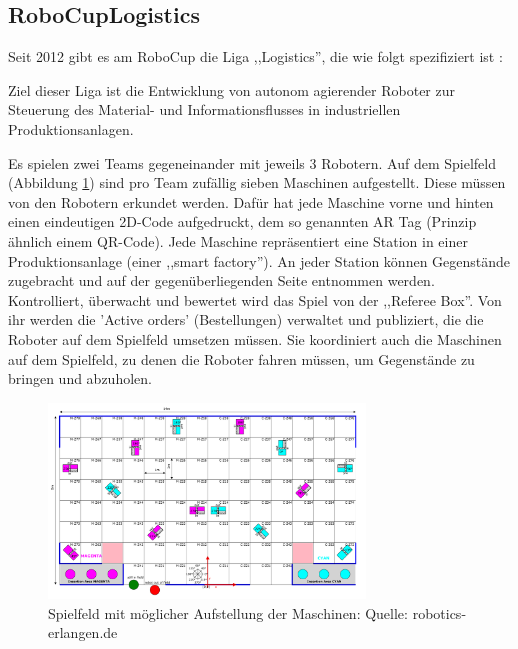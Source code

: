 \subsection{RoboCupLogistics}
Seit 2012 gibt es am RoboCup die Liga ,,Logistics'', die wie folgt spezifiziert ist \cite{wikipedia-robocup}:
\begin{formal}
	Ziel dieser Liga ist die Entwicklung von autonom agierender Roboter zur Steuerung des Material- und Informationsflusses in industriellen Produktionsanlagen.
\end{formal}
Es spielen zwei Teams gegeneinander mit jeweils 3 Robotern. Auf dem  Spielfeld (Abbildung \ref{fig:robocup_spielfeld}) sind pro Team zufällig sieben Maschinen  aufgestellt. Diese müssen von den Robotern erkundet werden. Dafür hat jede Maschine vorne und hinten einen eindeutigen 2D-Code aufgedruckt, dem so genannten AR Tag (Prinzip ähnlich einem QR-Code). Jede Maschine repräsentiert eine Station in einer Produktionsanlage (einer ,,smart factory''). An jeder Station können Gegenstände zugebracht und auf der gegenüberliegenden Seite entnommen werden. Kontrolliert, überwacht und bewertet wird das Spiel von der ,,Referee Box''. Von ihr werden die 'Active orders' (Bestellungen) verwaltet und publiziert, die die Roboter auf dem Spielfeld umsetzen müssen. Sie koordiniert auch die Maschinen auf dem Spielfeld, zu denen die Roboter fahren müssen, um Gegenstände zu bringen und abzuholen.
\begin{figure}[H]
	\centering
	\includegraphics[width=0.75\textwidth]{img/robocup-spielfeld-2d.png}
	\caption{Spielfeld mit möglicher Aufstellung der Maschinen: Quelle: robotics-erlangen.de \cite{robotics-erlangen.de}}
	\label{fig:robocup_spielfeld}
\end{figure}

